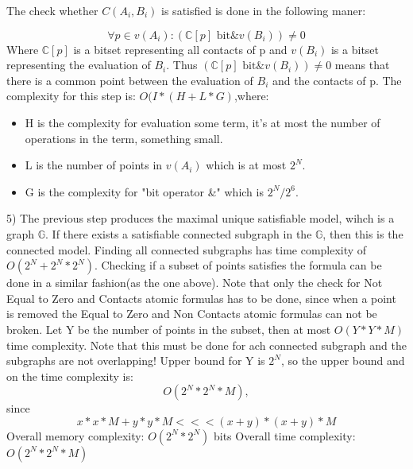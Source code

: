 \documentclass{article}
\begin{document}
			The check whether $C(A_i, B_i)$ is satisfied is done in the following maner:
			
			\begin{equation}
				\forall p \in v(A_i): (\mathbb{C}[p] \text{  bit\&  } v(B_i)) \neq 0
			\end{equation}
			Where $\mathbb{C}[p]$ is a bitset representing all contacts of p and 
			$v(B_i)$ is a bitset representing the evaluation of $B_i$.
			\newline
			Thus $(\mathbb{C}[p] \text{  bit\&  } v(B_i)) \neq 0$ means that there is 
			a common point between the evaluation of $B_i$ and the contacts of p.
			\newline
			\newline
			The complexity for this step is: $O(I * (H + L * G)$,where: 
			\begin{itemize}
				\item H is the complexity for evaluation some term, 
					it's at most the number of operations in the term, something small.
				\item L is the number of points in $v(A_i)$ which is at most $2^N$.
			       \item G is the complexity for "bit operator \&" which is $2^N/2^6$.
			\end{itemize}
		5) The previous step produces the maximal unique satisfiable model, wihch is a graph $\mathbb{G}$.
			If there exists a satisfiable connected subgraph in the $\mathbb{G}$, then this is the connected model.
			Finding all connected subgraphs has time complexity of $O(2^N + 2^N * 2^N)$.
			Checking if a subset of points satisfies the formula can be done in a similar fashion(as the one above).
			\newline
			Note that only the check for Not Equal to Zero and Contacts atomic formulas has to be done, 
			since when a point is removed the  Equal to Zero and Non Contacts atomic formulas can not be broken.
			\newline
			Let Y be the number of points in the subset, then at most $O(Y * Y * M)$ time complexity.
			Note that this must be done for ach connected subgraph and the subgraphs are not overlapping!
			Upper bound for Y is $2^N$, so the upper bound and on the time complexity is: 
			\begin{equation*}
				O(2^N * 2^N * M),
			\end{equation*}
			since 
			\begin{equation*}
				x * x * M + y * y * M <<< (x+y)*(x+y)*M
			\end{equation*}
			\newline
			\newline	
		Overall memory complexity: $O(2^N * 2^N)$ bits
		\newline
		Overall time complexity: $O(2^N * 2^N * M)$
\end{document}
